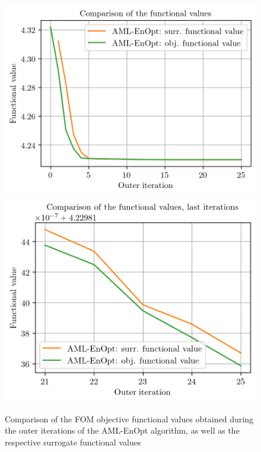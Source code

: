 \begin{figure}
\centering
\includegraphics{Plots/reducedFunctionalValueComp.png}
\includegraphics{Plots/reducedFunctionalValueCompLastIter.png}
\caption{\label{AMLEnOptFuncValComp}Comparison of the FOM objective functional values obtained during the outer iterations of the AML-EnOpt algorithm, as well as the respective surrogate functional values}
\end{figure}

